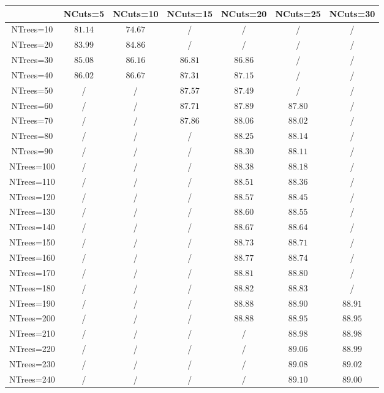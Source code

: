 \centering
\begin{tabular}{|c|c|c|c|c|c|c|} \hline
 & NCuts=5 & NCuts=10 & NCuts=15 & NCuts=20 & NCuts=25 & NCuts=30\\\hline
NTrees=10 & $81.14$ & $74.67$ &  / &  / &  / &  /\\\hline
NTrees=20 & $83.99$ & $84.86$ &  / &  / &  / &  /\\\hline
NTrees=30 & $85.08$ & $86.16$ & $86.81$ & $86.86$ &  / &  /\\\hline
NTrees=40 & $86.02$ & $86.67$ & $87.31$ & $87.15$ &  / &  /\\\hline
NTrees=50 &  / &  / & $87.57$ & $87.49$ &  / &  /\\\hline
NTrees=60 &  / &  / & $87.71$ & $87.89$ & $87.80$ &  /\\\hline
NTrees=70 &  / &  / & $87.86$ & $88.06$ & $88.02$ &  /\\\hline
NTrees=80 &  / &  / &  / & $88.25$ & $88.14$ &  /\\\hline
NTrees=90 &  / &  / &  / & $88.30$ & $88.11$ &  /\\\hline
NTrees=100 &  / &  / &  / & $88.38$ & $88.18$ &  /\\\hline
NTrees=110 &  / &  / &  / & $88.51$ & $88.36$ &  /\\\hline
NTrees=120 &  / &  / &  / & $88.57$ & $88.45$ &  /\\\hline
NTrees=130 &  / &  / &  / & $88.60$ & $88.55$ &  /\\\hline
NTrees=140 &  / &  / &  / & $88.67$ & $88.64$ &  /\\\hline
NTrees=150 &  / &  / &  / & $88.73$ & $88.71$ &  /\\\hline
NTrees=160 &  / &  / &  / & $88.77$ & $88.74$ &  /\\\hline
NTrees=170 &  / &  / &  / & $88.81$ & $88.80$ &  /\\\hline
NTrees=180 &  / &  / &  / & $88.82$ & $88.83$ &  /\\\hline
NTrees=190 &  / &  / &  / & $88.88$ & $88.90$ & $88.91$\\\hline
NTrees=200 &  / &  / &  / & $88.88$ & $88.95$ & $88.95$\\\hline
NTrees=210 &  / &  / &  / &  / & $88.98$ & $88.98$\\\hline
NTrees=220 &  / &  / &  / &  / & $89.06$ & $88.99$\\\hline
NTrees=230 &  / &  / &  / &  / & $89.08$ & $89.02$\\\hline
NTrees=240 &  / &  / &  / &  / & $89.10$ & $89.00$\\\hline

\end{tabular}
